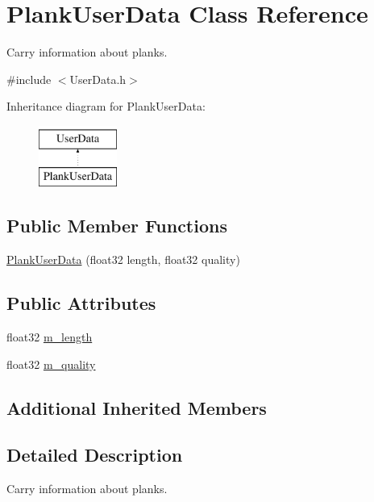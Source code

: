 \hypertarget{classPlankUserData}{\section{Plank\-User\-Data Class Reference}
\label{classPlankUserData}
}


Carry information about planks.  




{\ttfamily \#include $<$User\-Data.\-h$>$}

Inheritance diagram for Plank\-User\-Data\-:\begin{figure}[H]
\begin{center}
\leavevmode
\includegraphics[height=2.000000cm]{classPlankUserData}
\end{center}
\end{figure}
\subsection*{Public Member Functions}
\begin{DoxyCompactItemize}
\item 
\hyperlink{classPlankUserData_a0357a6e184cee3a636a373095cde606d}{Plank\-User\-Data} (float32 length, float32 quality)
\end{DoxyCompactItemize}
\subsection*{Public Attributes}
\begin{DoxyCompactItemize}
\item 
float32 \hyperlink{classPlankUserData_acb52b3118340b50102503b34e102b90b}{m\-\_\-length}
\item 
float32 \hyperlink{classPlankUserData_ae4136eaef48871ffbec502cdd4660d81}{m\-\_\-quality}
\end{DoxyCompactItemize}
\subsection*{Additional Inherited Members}


\subsection{Detailed Description}
Carry information about planks. 

